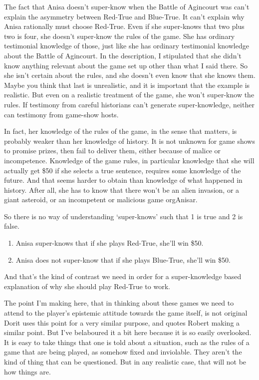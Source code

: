 \documentclass[11pt,]{book}
\providecommand{\tightlist}{%
  \setlength{\itemsep}{0pt}\setlength{\parskip}{0pt}}
\begin{document}
The fact that Anisa doesn't super-know when the Battle of Agincourt was can't explain the asymmetry between Red-True and Blue-True. It can't explain why Anisa rationally must choose Red-True. Even if she super-knows that two plus two is four, she doesn't super-know the rules of the game. She has ordinary testimonial knowledge of those, just like she has ordinary testimonial knowledge about the Battle of Agincourt. In the description, I stipulated that she didn't know anything relevant about the game set up other than what I said there. So she isn't certain about the rules, and she doesn't even know that she knows them. Maybe you think that last is unrealistic, and it is important that the example is realistic. But even on a realistic treatment of the game, she won't super-know the rules. If testimony from careful historians can't generate super-knowledge, neither can testimony from game-show hosts.

In fact, her knowledge of the rules of the game, in the sense that matters, is probably weaker than her knowledge of history. It is not unknown for game shows to promise prizes, then fail to deliver them, either because of malice or incompetence. Knowledge of the game rules, in particular knowledge that she will actually get \$50 if she selects a true sentence, requires some knowledge of the future. And that seems harder to obtain than knowledge of what happened in history. After all, she has to know that there won't be an alien invasion, or a giant asteroid, or an incompetent or malicious game orgAnisar.

So there is no way of understanding `super-knows' such that 1 is true and 2 is false.

\begin{enumerate}
\def\labelenumi{\arabic{enumi}.}
\tightlist
\item
  Anisa super-knows that if she plays Red-True, she'll win \$50.
\item
  Anisa does not super-know that if she plays Blue-True, she'll win \$50.
\end{enumerate}

And that's the kind of contrast we need in order for a super-knowledge based explanation of why she should play Red-True to work.

The point I'm making here, that in thinking about these games we need to attend to the player's epistemic attitude towards the game itself, is not original Dorit \citet{Ganson2019} uses this point for a very similar purpose, and quotes Robert \citet{Nozick1981} making a similar point. But I've belaboured it a bit here because it is so easily overlooked. It is easy to take things that one is told about a situation, such as the rules of a game that are being played, as somehow fixed and inviolable. They aren't the kind of thing that can be questioned. But in any realistic case, that will not be how things are.
\end{document}
